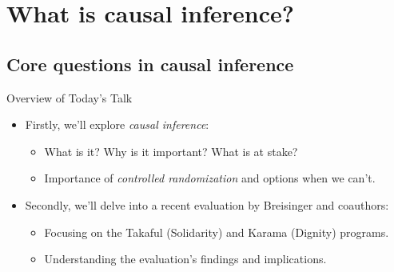 \documentclass{beamer}
\begin{document}

\section{What is causal inference?}



\subsection{Core questions in causal inference}



\begin{frame}{Overview of Today's Talk}
\begin{itemize}
\item Firstly, we'll explore \emph{causal inference}: 
    \begin{itemize}
    \item What is it?  Why is it important?  What is at stake? %
    \item Importance of \emph{controlled randomization} and options when we can't.
    \end{itemize}
\item Secondly, we'll delve into a recent evaluation by Breisinger and coauthors:
    \begin{itemize}
    \item Focusing on the Takaful (Solidarity) and Karama (Dignity) programs.
    \item Understanding the evaluation's findings and implications.
    \end{itemize}
\end{itemize}
\end{frame}
\end{document}
